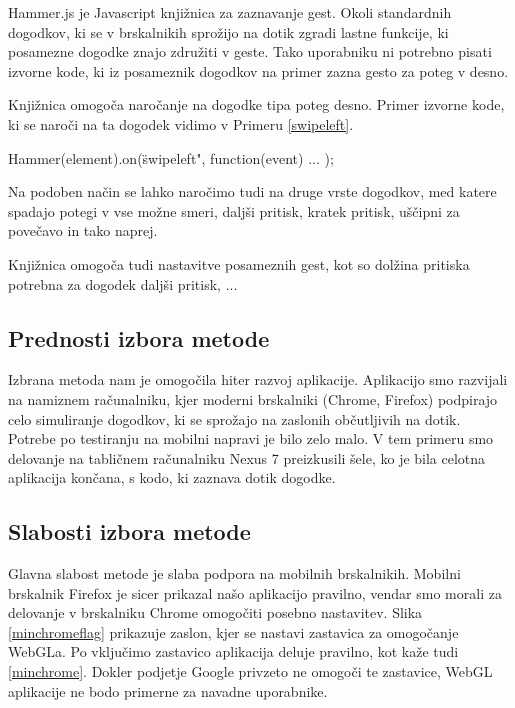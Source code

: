 Hammer.js je Javascript knjižnica za zaznavanje gest. Okoli standardnih dogodkov, ki se v brskalnikih sprožijo na dotik zgradi lastne funkcije, ki posamezne dogodke znajo združiti v geste. Tako uporabniku ni potrebno pisati izvorne kode, ki iz posameznik dogodkov na primer zazna gesto za poteg v desno.

Knjižnica omogoča naročanje na dogodke tipa poteg desno. Primer izvorne kode, ki se naroči na ta dogodek vidimo v Primeru \ref{swipeleft}.

Hammer(element).on(\"swipeleft", function(event){ ... }); 

Na podoben način se lahko naročimo tudi na druge vrste dogodkov, med katere spadajo potegi v vse možne smeri, daljši pritisk, kratek pritisk, uščipni za povečavo in tako naprej.

Knjižnica omogoča tudi nastavitve posameznih gest, kot so dolžina pritiska potrebna za dogodek daljši pritisk, ...

\subsection{Prednosti izbora metode}

Izbrana metoda nam je omogočila hiter razvoj aplikacije. Aplikacijo smo razvijali na namiznem računalniku, kjer moderni brskalniki (Chrome, Firefox) podpirajo celo simuliranje dogodkov, ki se sprožajo na zaslonih občutljivih na dotik. Potrebe po testiranju na mobilni napravi je bilo zelo malo. V tem primeru smo delovanje na tabličnem računalniku Nexus 7 preizkusili šele, ko je bila celotna aplikacija končana, s kodo, ki zaznava dotik dogodke.

\subsection{Slabosti izbora metode}

Glavna slabost metode je slaba podpora na mobilnih brskalnikih. Mobilni brskalnik Firefox je sicer prikazal našo aplikacijo pravilno, vendar smo morali za delovanje v brskalniku Chrome omogočiti posebno nastavitev. Slika \ref{minchromeflag} prikazuje zaslon, kjer se nastavi zastavica za omogočanje WebGLa. Po vključimo zastavico aplikacija deluje pravilno, kot kaže tudi \ref{minchrome}. Dokler podjetje Google privzeto ne omogoči te zastavice, WebGL aplikacije ne bodo primerne za navadne uporabnike. 

